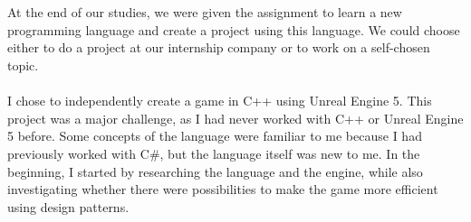 
\chapter*{}

At the end of our studies, we were given the assignment to learn a new programming language and create a project using this language.
We could choose either to do a project at our internship company or to work on a self-chosen topic.
\\
\\
I chose to independently create a game in C++ using Unreal Engine 5.
This project was a major challenge, as I had never worked with C++ or Unreal Engine 5 before.
Some concepts of the language were familiar to me because I had previously worked with C\#, but the language itself was new to me.
In the beginning, I started by researching the language and the engine, while also investigating whether there were possibilities to make the game more efficient using design patterns.